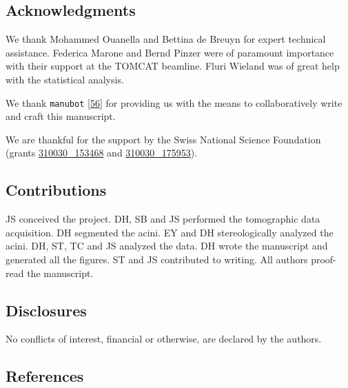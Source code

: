 \documentclass[
  american,
]{article}
\begin{document}
\hypertarget{acknowledgments}{%
\subsection{Acknowledgments}\label{acknowledgments}}

We thank Mohammed Ouanella and Bettina de Breuyn for expert technical assistance.
Federica Marone and Bernd Pinzer were of paramount importance with their support at the TOMCAT beamline.
Fluri Wieland was of great help with the statistical analysis.

We thank \texttt{manubot} {[}\protect\hyperlink{ref-YuJbg3zO}{56}{]} for providing us with the means to collaboratively write and craft this manuscript.

We are thankful for the support by the Swiss National Science Foundation (grants \href{http://p3.snf.ch/project-153468}{310030\_153468} and \href{http://p3.snf.ch/project-175953}{310030\_175953}).

\hypertarget{contributions}{%
\subsection{Contributions}\label{contributions}}

JS conceived the project.
DH, SB and JS performed the tomographic data acquisition.
DH segmented the acini.
EY and DH stereologically analyzed the acini.
DH, ST, TC and JS analyzed the data.
DH wrote the manuscript and generated all the figures.
ST and JS contributed to writing.
All authors proof-read the manuscript.

\hypertarget{disclosures}{%
\subsection{Disclosures}\label{disclosures}}

No conﬂicts of interest, financial or otherwise, are declared by the authors.

\hypertarget{references}{%
\subsection{References}\label{references}}
\end{document}
